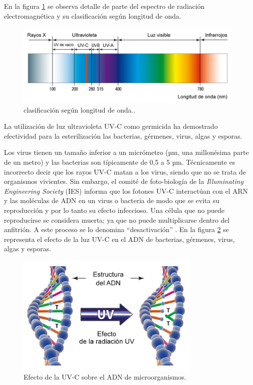 En la  figura \ref{fig:espectro} se observa detalle de parte del espectro de radiación electromagnética y su clasificación según longitud de onda.


\begin{figure}[h]
	\centering
	\includegraphics[width=14cm]{./Figures/espectro.PNG}
	\caption{clasificación según longitud de onda.\protect\footnotemark.}
	\label{fig:espectro}
\end{figure}

La utilización de luz ultravioleta UV-C como germicida ha demostrado efectividad para la esterilización  las bacterias, gérmenes, virus, algas y esporas. 

Los virus tienen un tamaño inferior a un micrómetro (µm, una millonésima parte de un metro) y las bacterias son típicamente de 0,5 a 5 µm. Técnicamente es incorrecto decir que los rayos  UV-C matan a los virus, siendo que no se trata de organismos vivientes. Sin embargo, el comité de foto-biología de la \emph{ Illuminating Engineering Society} (IES) informa que los fotones UV-C interactúan con el ARN y las moléculas de ADN en un virus o bacteria de modo que se evita su reproducción y por lo tanto su efecto infeccioso. Una célula que no puede reproducirse se considera muerta; ya que no puede multiplicarse dentro del anfitrión. A este proceso se lo denomina “desactivación”   \citep{IES}. En la figura \ref{fig:adn} se representa el efecto de la luz UV-C en el ADN de bacterias, gérmenes, virus, algas y esporas. 
 

\begin{figure}[h]
	\centering
	\includegraphics[width=9cm]{./Figures/adn.png}
	\caption{Efecto de la UV-C sobre el ADN de microorganismos\protect\footnotemark.}
	\label{fig:adn}
\end{figure}

